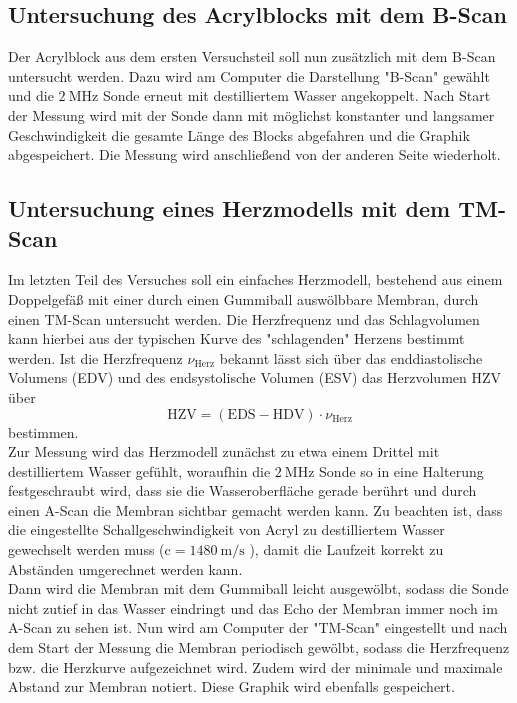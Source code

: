 \subsection{Untersuchung des Acrylblocks mit dem B-Scan}
Der Acrylblock aus dem ersten Versuchsteil soll nun zusätzlich mit dem B-Scan untersucht werden.
Dazu wird am Computer die Darstellung "B-Scan" gewählt und die $\SI{2}{\mega\hertz}$ Sonde
erneut mit destilliertem Wasser angekoppelt. Nach Start der Messung wird mit der Sonde
dann mit möglichst konstanter und langsamer Geschwindigkeit die gesamte Länge des
Blocks abgefahren und die Graphik abgespeichert. Die Messung wird anschließend von
der anderen Seite wiederholt.

\subsection{Untersuchung eines Herzmodells mit dem TM-Scan}
Im letzten Teil des Versuches soll ein einfaches Herzmodell, bestehend aus
einem Doppelgefäß mit einer durch einen Gummiball auswölbbare Membran,
durch einen TM-Scan untersucht werden. Die Herzfrequenz und das Schlagvolumen kann hierbei
aus der typischen Kurve des "schlagenden" Herzens bestimmt werden.
Ist die Herzfrequenz $\nu_{\text{Herz}}$ bekannt lässt sich über das
enddiastolische Volumens (EDV) und des endsystolische Volumen (ESV) das Herzvolumen HZV
über
\begin{equation}
  \text{HZV}= (\text{EDS} - \text{HDV})\cdot \nu_{\text{Herz}}
\end{equation}
bestimmen. \\

Zur Messung wird das Herzmodell zunächst zu etwa einem Drittel mit destilliertem
Wasser gefühlt, woraufhin die $\SI{2}{\mega\hertz}$ Sonde so in eine Halterung
festgeschraubt wird, dass sie die Wasseroberfläche gerade berührt und durch einen
A-Scan die Membran sichtbar gemacht werden kann. Zu beachten ist, dass die eingestellte
Schallgeschwindigkeit von Acryl zu destilliertem Wasser gewechselt werden muss
($\text{c} = \SI{1480}{\meter\per\second}$ ), damit die Laufzeit korrekt zu Abständen
umgerechnet werden kann.
\\
Dann wird die Membran mit dem Gummiball leicht ausgewölbt, sodass die Sonde nicht zutief
in das Wasser eindringt und das Echo der Membran immer noch im A-Scan zu sehen ist.
Nun wird am Computer der "TM-Scan" eingestellt und nach dem Start der Messung die Membran
periodisch gewölbt, sodass die Herzfrequenz bzw. die Herzkurve aufgezeichnet wird.
Zudem wird der minimale und maximale Abstand zur Membran notiert.
Diese Graphik wird ebenfalls gespeichert.
